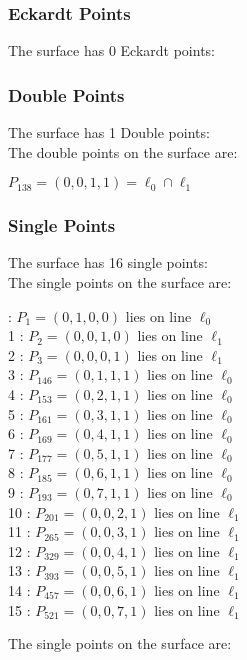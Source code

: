 \documentclass{article}
\begin{document}
{\subsubsection*{Eckardt Points}
The surface has 0 Eckardt points:\\
\subsubsection*{Double Points}
The surface has 1 Double points:\\
The double points on the surface are:\\
\begin{multicols}{2}
\noindent
$P_{138} = ( 0, 0, 1, 1 ) = \ell_{0} \cap \ell_{1} $\\
\end{multicols}
\subsubsection*{Single Points}
The surface has 16 single points:\\
The single points on the surface are:\\
\begin{multicols}{2}
 : $P_{1}=( 0, 1, 0, 0 )$ lies on line $\ell_{0}$\\
1 : $P_{2}=( 0, 0, 1, 0 )$ lies on line $\ell_{1}$\\
2 : $P_{3}=( 0, 0, 0, 1 )$ lies on line $\ell_{1}$\\
3 : $P_{146}=( 0, 1, 1, 1 )$ lies on line $\ell_{0}$\\
4 : $P_{153}=( 0, 2, 1, 1 )$ lies on line $\ell_{0}$\\
5 : $P_{161}=( 0, 3, 1, 1 )$ lies on line $\ell_{0}$\\
6 : $P_{169}=( 0, 4, 1, 1 )$ lies on line $\ell_{0}$\\
7 : $P_{177}=( 0, 5, 1, 1 )$ lies on line $\ell_{0}$\\
8 : $P_{185}=( 0, 6, 1, 1 )$ lies on line $\ell_{0}$\\
9 : $P_{193}=( 0, 7, 1, 1 )$ lies on line $\ell_{0}$\\
10 : $P_{201}=( 0, 0, 2, 1 )$ lies on line $\ell_{1}$\\
11 : $P_{265}=( 0, 0, 3, 1 )$ lies on line $\ell_{1}$\\
12 : $P_{329}=( 0, 0, 4, 1 )$ lies on line $\ell_{1}$\\
13 : $P_{393}=( 0, 0, 5, 1 )$ lies on line $\ell_{1}$\\
14 : $P_{457}=( 0, 0, 6, 1 )$ lies on line $\ell_{1}$\\
15 : $P_{521}=( 0, 0, 7, 1 )$ lies on line $\ell_{1}$\\
\end{multicols}
The single points on the surface are:\\
}
\end{document}
